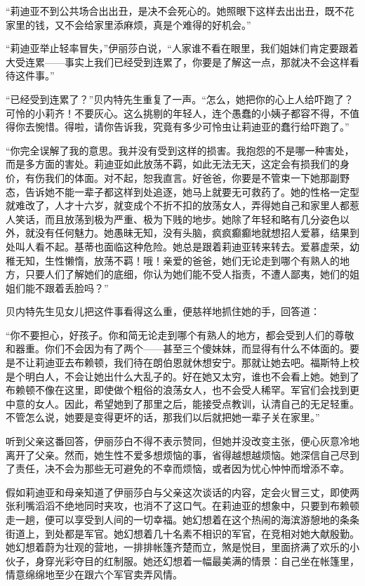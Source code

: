 \par “莉迪亚不到公共场合出出丑，是决不会死心的。她照眼下这样去出出丑，既不花家里的钱，又不会给家里添麻烦，真是个难得的好机会。”
\par “莉迪亚举止轻率冒失，”伊丽莎白说，“人家谁不看在眼里，我们姐妹们肯定要跟着大受连累——事实上我们已经受到连累了，你要是了解这一点，那就决不会这样看待这件事。”
\par “已经受到连累了？”贝内特先生重复了一声。“怎么，她把你的心上人给吓跑了？可怜的小莉齐！不要灰心。这么挑剔的年轻人，连个愚蠢的小姨子都容不得，不值得你去惋惜。得啦，请你告诉我，究竟有多少可怜虫让莉迪亚的蠢行给吓跑了。”
\par “你完全误解了我的意思。我并没有受到这样的损害。我抱怨的不是哪一种害处，而是多方面的害处。莉迪亚如此放荡不羁，如此无法无天，这定会有损我们的身价，有伤我们的体面。对不起，恕我直言。好爸爸，你要是不管束一下她那副野态，告诉她不能一辈子都这样到处追逐，她马上就要无可救药了。她的性格一定型就难改了，人才十六岁，就变成个不折不扣的放荡女人，弄得她自己和家里人都惹人笑话，而且放荡到极为严重、极为下贱的地步。她除了年轻和略有几分姿色以外，就没有任何魅力。她愚昧无知，没有头脑，疯疯癫癫地就想招人爱慕，结果到处叫人看不起。基蒂也面临这种危险。她总是跟着莉迪亚转来转去。爱慕虚荣，幼稚无知，生性懒惰，放荡不羁！哦！亲爱的爸爸，她们无论走到哪个有熟人的地方，只要人们了解她们的底细，你认为她们能不受人指责，不遭人鄙夷，她们的姐姐们能不跟着丢脸吗？”
\par 贝内特先生见女儿把这件事看得这么重，便慈祥地抓住她的手，回答道：
\par “你不要担心，好孩子。你和简无论走到哪个有熟人的地方，都会受到人们的尊敬和器重。你们不会因为有了两个——甚至三个傻妹妹，而显得有什么不体面的。要是不让莉迪亚去布赖顿，我们待在朗伯恩就休想安宁。那就让她去吧。福斯特上校是个明白人，不会让她出什么大乱子的。好在她又太穷，谁也不会看上她。她到了布赖顿不像在这里，即使做个粗俗的浪荡女人，也不会受人稀罕。军官们会找到更中意的女人。因此，希望她到了那里之后，能接受点教训，认清自己的无足轻重。不管怎么说，她要是变得更坏的话，那我们以后就把她一辈子关在家里。”
\par 听到父亲这番回答，伊丽莎白不得不表示赞同，但她并没改变主张，便心灰意冷地离开了父亲。然而，她生性不爱多想烦恼的事，省得越想越烦恼。她深信自己尽到了责任，决不会为那些无可避免的不幸而烦恼，或者因为忧心忡忡而增添不幸。
\par 假如莉迪亚和母亲知道了伊丽莎白与父亲这次谈话的内容，定会火冒三丈，即使两张利嘴滔滔不绝地同时夹攻，也消不了这口气。在莉迪亚的想象中，只要到布赖顿走一趟，便可以享受到人间的一切幸福。她幻想着在这个热闹的海滨游憩地的条条街道上，到处都是军官。她幻想着几十名素不相识的军官，在竞相对她大献殷勤。她幻想着蔚为壮观的营地，一排排帐篷齐楚而立，煞是悦目，里面挤满了欢乐的小伙子，身穿光彩夺目的红制服。她还幻想着一幅最美满的情景：自己坐在帐篷里，情意绵绵地至少在跟六个军官卖弄风情。
